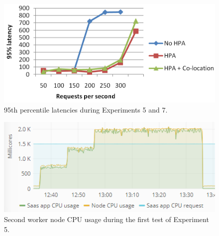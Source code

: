 \begin{figure}
\centering
\includegraphics[width=0.75\columnwidth]{Images/Experiments/CPU/Latencies/lat-exp5-7.PNG}
\caption{95th percentile latencies during Experiments 5 and 7.}
\vspace*{-5mm}
\label{fig:lat-saas-li}
\end{figure}

\begin{figure}
\centering
\includegraphics[width=0.70\columnwidth]{Images/Experiments/CPU/Grafana/cpu-saas-li.PNG}
\caption{Second worker node CPU usage during the first test of Experiment 5.}
\label{fig:cpu-saas-li}
\end{figure}

%


